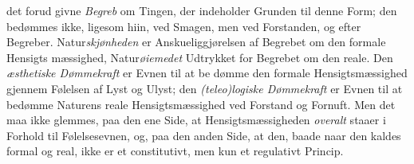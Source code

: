 \documentclass[12pt,a4paper]{book}
\begin{document}
det forud givne \emph{Begreb} om Tingen, der indeholder Grunden
til denne Form; den bedømmes ikke, ligesom hiin, ved Smagen,
men ved Forstanden, og efter Begreber. Natur\emph{skjønheden}
er Anskueliggjørelsen af Begrebet om den formale Hensigts\-%
mæssighed, Natur\emph{øiemedet} Udtrykket for Begrebet om den
reale. Den \emph{æsthetiske Dømmekraft} er Evnen til at be\-%
dømme den formale Hensigtsmæssighed gjennem Følelsen
af Lyst og Ulyst; den \emph{(teleo)logiske Dømmekraft} er
Evnen til at bedømme Naturens reale Hensigtsmæssighed ved
Forstand og Fornuft. Men det maa ikke glemmes, paa den
ene Side, at Hensigtsmæssigheden \emph{overalt} staaer i Forhold
til Følelsesevnen, og, paa den anden Side, at den, baade naar
den kaldes formal og real, ikke er et constitutivt, men kun et
regulativt Princip.
\end{document}
